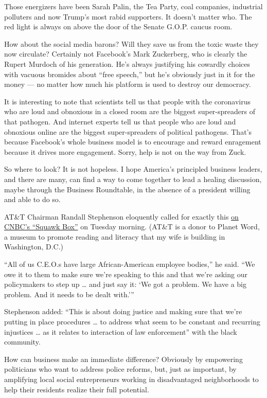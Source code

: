 Those energizers have been Sarah Palin, the Tea Party, coal companies,
industrial polluters and now Trump's most rabid supporters. It doesn't
matter who. The red light is always on above the door of the Senate
G.O.P. caucus room.

How about the social media barons? Will they save us from the toxic
waste they now circulate? Certainly not Facebook's Mark Zuckerberg, who
is clearly the Rupert Murdoch of his generation. He's always justifying
his cowardly choices with vacuous bromides about ``free speech,'' but
he's obviously just in it for the money --- no matter how much his
platform is used to destroy our democracy.

It is interesting to note that scientists tell us that people with the
coronavirus who are loud and obnoxious in a closed room are the biggest
super-spreaders of that pathogen. And internet experts tell us that
people who are loud and obnoxious online are the biggest super-spreaders
of political pathogens. That's because Facebook's whole business model
is to encourage and reward enragement because it drives more engagement.
Sorry, help is not on the way from Zuck.

So where to look? It is not hopeless. I hope America's principled
business leaders, and there are many, can find a way to come together to
lead a healing discussion, maybe through the Business Roundtable, in the
absence of a president willing and able to do so.

AT\&T Chairman Randall Stephenson eloquently called for exactly this
\href{https://www.cnbc.com/2020/06/02/atts-randall-stephenson-calls-on-fellow-ceos-to-speak-up-for-justice.html}{on
CNBC's ``Squawk Box''} on Tuesday morning. (AT\&T is a donor to Planet
Word, a museum to promote reading and literacy that my wife is building
in Washington, D.C.)

``All of us C.E.O.s have large African-American employee bodies,'' he
said. ``We owe it to them to make sure we're speaking to this and that
we're asking our policymakers to step up \ldots{} and just say it: `We
got a problem. We have a big problem. And it needs to be dealt with.'''

Stephenson added: ``This is about doing justice and making sure that
we're putting in place procedures \ldots{} to address what seem to be
constant and recurring injustices \ldots{} as it relates to interaction
of law enforcement'' with the black community.

How can business make an immediate difference? Obviously by empowering
politicians who want to address police reforms, but, just as important,
by amplifying local social entrepreneurs working in disadvantaged
neighborhoods to help their residents realize their full potential.

